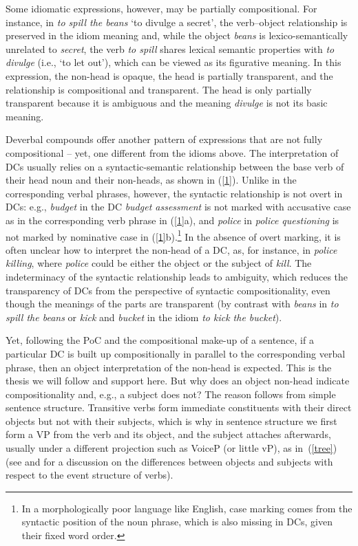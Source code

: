 \documentclass[output=paper]{langsci/langscibook}
\begin{document}
Some idiomatic expressions, however, may be partially compositional. For instance, in \textit{to spill the beans} \lq to divulge a secret\rq, the verb--object relationship is preserved in the idiom meaning and, while the object \textit{beans} is lexico-semantically unrelated to \textit{secret}, the verb \textit{to spill} shares lexical semantic properties with \textit{to divulge} (i.e., \lq to let out\rq), which can be viewed as its figurative meaning. In this expression, the non-head is opaque, the head is partially transparent, and the relationship is compositional and transparent. The head is only partially transparent because it is ambiguous and the meaning \textit{divulge} is not its basic meaning.

 {Deverbal compounds offer another pattern of expressions that are not fully compositional -- yet, one different from the idioms above. The interpretation of DCs usually relies on a syntactic-semantic relationship between the base verb of their head noun and their non-heads, as shown in (\ref{1}). Unlike in the corresponding verbal phrases, however, the syntactic relationship is not overt in DCs: e.g., \textit{budget} in the DC \textit{budget assessment} is not marked with accusative case as in the corresponding verb phrase in (\ref{1}a), and \textit{police} in \textit{police questioning} is not marked by nominative case in (\ref{1}b).}\footnote{ {In a morphologically poor language like English,  case marking comes from the syntactic position of the noun phrase, which is also missing in DCs, given their fixed word order.}}  {In the absence of overt marking, it is often unclear how to interpret the non-head of a DC, as, for instance, in \textit{police killing}, where \textit{police} could be either the object or the subject of \textit{kill}. The indeterminacy of the syntactic relationship leads to ambiguity, which reduces the transparency of DCs from the perspective of syntactic compositionality, even though the meanings of the parts are transparent (by contrast with \textit{beans} in \textit{to spill the beans} or \textit{kick} and \textit{bucket} in the idiom \textit{to kick the bucket}).}


 {Yet, following the PoC and the compositional make-up of a sentence, if a particular DC is built up compositionally in parallel to the corresponding verbal phrase, then an object interpretation of the non-head is expected. This is the thesis we will follow and support  here. But why does an object non-head indicate compositionality and, e.g., a subject does not? The reason follows from simple sentence structure. Transitive verbs form immediate constituents with their direct objects but not with their subjects, which is why in sentence structure we first form a VP from the verb and its object, and the subject attaches afterwards, usually under a different projection such as VoiceP (or little vP), as in~(\ref{tree}) (see \citealt{chomsky:95} and \citealt{kratzer:96} for a discussion on the differences between objects and subjects with respect to the event structure of verbs).}
\end{document}
